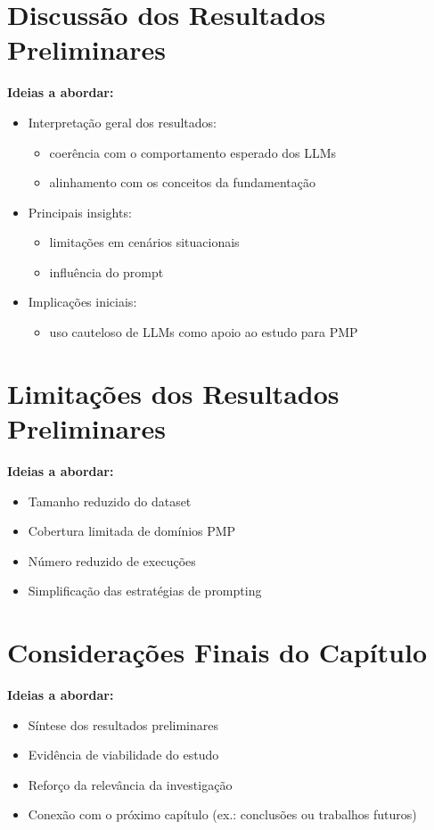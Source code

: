 \section{Discussão dos Resultados Preliminares}
\label{subsec:discussao_preliminar}

\textbf{Ideias a abordar:}
\begin{itemize}
    \item Interpretação geral dos resultados:
    \begin{itemize}
        \item coerência com o comportamento esperado dos LLMs
        \item alinhamento com os conceitos da fundamentação
    \end{itemize}
    \item Principais insights:
    \begin{itemize}
        \item limitações em cenários situacionais
        \item influência do prompt
    \end{itemize}
    \item Implicações iniciais:
    \begin{itemize}
        \item uso cauteloso de LLMs como apoio ao estudo para PMP
    \end{itemize}
\end{itemize}

\section{Limitações dos Resultados Preliminares}
\label{subsec:limitacoes_prelim}

\textbf{Ideias a abordar:}
\begin{itemize}
    \item Tamanho reduzido do dataset
    \item Cobertura limitada de domínios PMP
    \item Número reduzido de execuções
    \item Simplificação das estratégias de prompting
\end{itemize}

\section{Considerações Finais do Capítulo}
\label{subsec:resultados_final}

\textbf{Ideias a abordar:}
\begin{itemize}
    \item Síntese dos resultados preliminares
    \item Evidência de viabilidade do estudo
    \item Reforço da relevância da investigação
    \item Conexão com o próximo capítulo (ex.: conclusões ou trabalhos futuros)
\end{itemize}